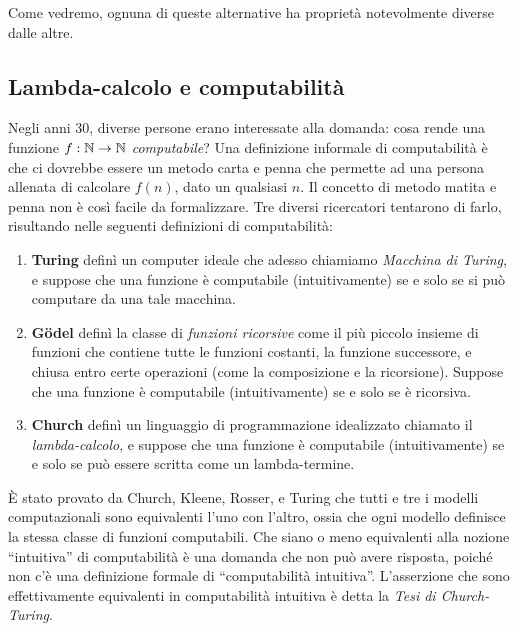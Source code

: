 \documentclass{article}
\begin{document}
Come vedremo, ognuna di queste alternative ha propriet\`a notevolmente
diverse dalle altre.

\subsection{Lambda-calcolo e computabilit\`a}

Negli anni 30, diverse persone erano interessate alla domanda: cosa
rende una funzione $f:\mathbb{N}\to\mathbb{N}$ {\em computabile}? Una
definizione informale di computabilit\`a \`e che ci dovrebbe essere un metodo 
carta e penna che permette ad una persona allenata di calcolare $f(n)$,
dato un qualsiasi $n$. Il concetto di metodo matita e penna non \`e
cos\`i facile da formalizzare. Tre diversi ricercatori tentarono di farlo,
risultando nelle seguenti definizioni di computabilit\`a:

\begin{enumerate}
\item {\bf Turing} defin\`i un computer ideale che adesso chiamiamo 
{\em Macchina di Turing}, e suppose che una funzione \`e computabile 
(intuitivamente) se e solo se si pu\`o computare da una tale macchina.
\item {\bf G\"odel} defin\`i la classe di {\em funzioni ricorsive} come il 
pi\`u piccolo insieme di funzioni che contiene tutte le funzioni costanti, 
la funzione successore, e chiusa entro certe operazioni (come la 
composizione e la ricorsione). Suppose che una funzione \`e computabile 
(intuitivamente) se e solo se \`e ricorsiva.
\item {\bf Church} defin\`i un linguaggio di programmazione idealizzato 
chiamato il {\em lambda-calcolo}, e suppose che una funzione
\`e computabile (intuitivamente) se e solo se pu\`o
essere scritta come un lambda-termine.
\end{enumerate}

\`E stato provato da Church, Kleene, Rosser, e Turing che tutti e
tre i modelli computazionali sono equivalenti l'uno con l'altro, ossia che
ogni modello definisce la stessa classe di funzioni computabili. Che siano o meno
equivalenti alla nozione ``intuitiva'' di computabilit\`a \`e
una domanda che non pu\`o avere risposta, poiché non c'\`e una definizione
formale di ``computabilit\`a intuitiva''. L'asserzione che sono
effettivamente equivalenti in computabilit\`a intuitiva \`e detta la
{\em Tesi di Church-Turing}.

\end{document}
